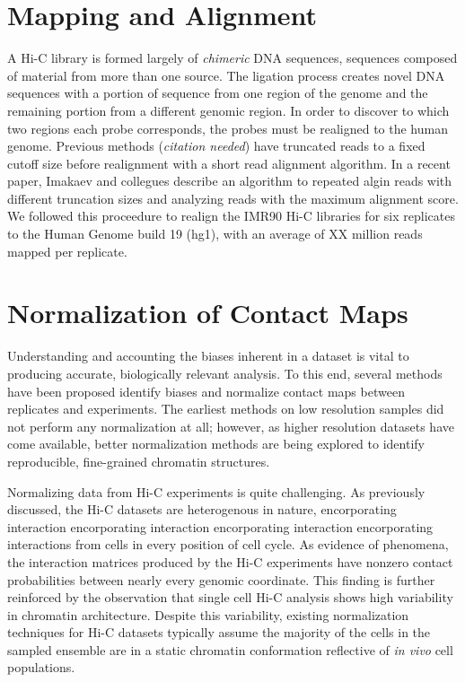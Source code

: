 \documentclass[phd,tocprelim]{cornell}
\begin{document}




\section{Mapping and Alignment}

A Hi-C library is formed largely of \textit{chimeric} DNA sequences,
sequences composed of material from more than one source.  The ligation process
creates novel DNA sequences with a portion of sequence from one region of
the genome and the remaining portion from a different genomic region.  In
order to discover to which two regions each probe corresponds, the probes
must be realigned to the human genome.  Previous methods (\textit{citation needed})
have truncated reads to a fixed cutoff size before realignment with a short
read alignment algorithm.  In a recent paper, Imakaev and collegues
describe an algorithm to repeated algin reads with different truncation sizes
and analyzing reads with the maximum alignment score\cite{imakaev2012}.  We followed
this proceedure to realign the IMR90 Hi-C libraries for six replicates to
the Human Genome build 19 (hg1), with an average of XX million reads
mapped per replicate.

\section{Normalization of Contact Maps}

Understanding and accounting the biases inherent in a dataset is vital to
producing accurate, biologically relevant analysis.  To this end, several methods
have been proposed identify biases and normalize contact maps between replicates
and experiments\cite{yaffe2011}\cite{hu2012}\cite{yang2014}.  The earliest methods on low
resolution samples did not perform any normalization at all\cite{aiden2009};
however, as higher resolution datasets have come available, better
normalization methods are being explored to identify reproducible,
fine-grained chromatin structures.

Normalizing data from Hi-C experiments is quite challenging.  As previously
discussed, the Hi-C datasets are heterogenous in nature, encorporating interaction encorporating interaction encorporating interaction encorporating
interactions from cells in every position of cell cycle.  As evidence of phenomena,
the interaction matrices produced by the Hi-C experiments have nonzero contact
probabilities between nearly every genomic coordinate\cite{dekker2013}.  This
finding is further reinforced by the observation that single cell Hi-C analysis
shows high variability in chromatin architecture\cite{nagano2013}.  Despite this
variability, existing normalization techniques for Hi-C datasets typically
assume the majority of the cells in the sampled ensemble are in a static
chromatin conformation reflective of \textit{in vivo} cell populations.
\end{document}
